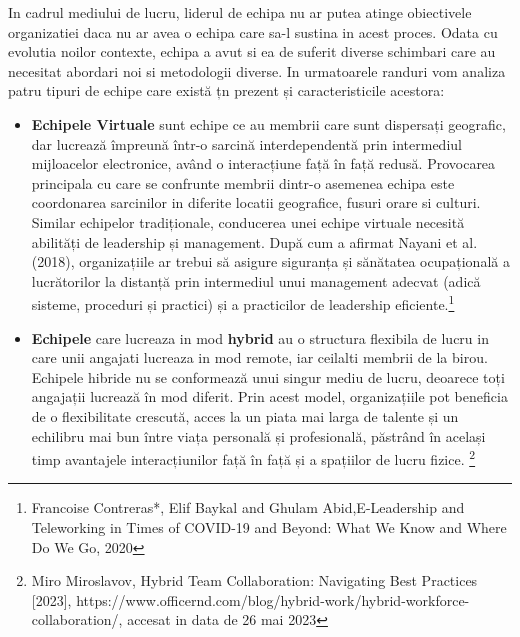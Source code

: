 \documentclass[a4paper, 12pt]{article}
\begin{document}
	\quad\quad In cadrul mediului de lucru, liderul de echipa nu ar putea atinge obiectivele organizatiei daca nu ar avea o echipa care sa-l sustina in acest proces. Odata cu evolutia noilor contexte, echipa a avut si ea de suferit diverse schimbari care au necesitat abordari noi si metodologii diverse. In urmatoarele randuri vom analiza patru tipuri de echipe care există țn prezent și caracteristicile acestora:

%
	\begin{itemize}

	\item \textbf{Echipele Virtuale} sunt echipe ce au membrii care sunt dispersați geografic, dar lucrează împreună într-o sarcină interdependentă prin intermediul mijloacelor electronice, având o interacțiune față în față redusă. Provocarea principala cu care se confrunte membrii dintr-o asemenea echipa este coordonarea sarcinilor in diferite locatii geografice, fusuri orare si culturi. Similar echipelor tradiționale, conducerea unei echipe virtuale necesită abilități de leadership și management. După cum a afirmat Nayani et al. (2018), organizațiile ar trebui să asigure siguranța și sănătatea ocupațională a lucrătorilor la distanță prin intermediul unui management adecvat (adică sisteme, proceduri și practici) și a practicilor de leadership eficiente.\footnote{Francoise Contreras*, Elif Baykal and Ghulam Abid,E-Leadership and Teleworking in Times of COVID-19 and Beyond: What We Know and Where Do We Go, 2020}

	\item \textbf{Echipele} care lucreaza in mod \textbf{hybrid} au o structura flexibila de lucru in care unii angajati lucreaza in mod remote, iar ceilalti membrii de la birou. Echipele hibride nu se conformează unui singur mediu de lucru, deoarece toți angajații lucrează în mod diferit. Prin acest model, organizațiile pot beneficia de o flexibilitate crescută, acces la un piata mai larga de talente și un echilibru mai bun între viața personală și profesională, păstrând în același timp avantajele interacțiunilor față în față și a spațiilor de lucru fizice. \footnote{Miro Miroslavov, Hybrid Team Collaboration: Navigating Best Practices [2023], https://www.officernd.com/blog/hybrid-work/hybrid-workforce-collaboration/,  accesat in data de 26 mai 2023}


\end{itemize}
\end{document}
